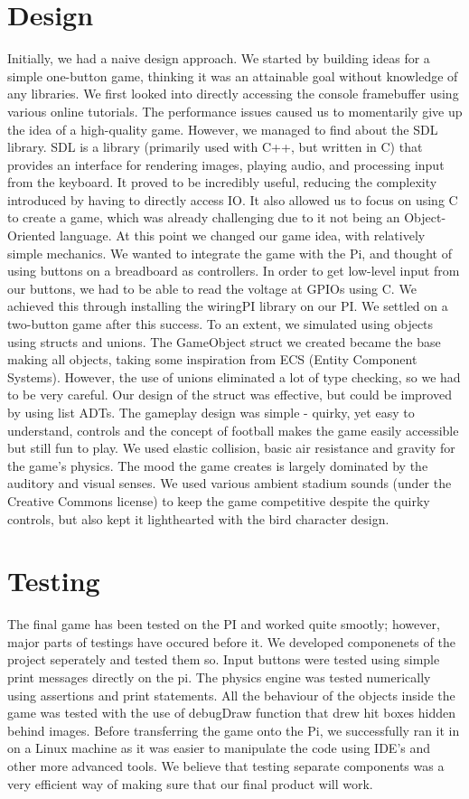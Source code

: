 \documentclass[11pt]{article}
\begin{document}
\section{Design}
Initially, we had a naive design approach. We started by building ideas for a simple one-button game, thinking it was an attainable goal without knowledge of any libraries. We first looked into directly accessing the console framebuffer using various online tutorials. The performance issues caused us to momentarily give up the idea of a high-quality game.
However, we managed to find about the SDL library. SDL is a library (primarily used with C++, but written in C) that provides an interface for rendering images, playing audio, and processing input from the keyboard. It proved to be incredibly useful, reducing the complexity introduced by having to directly access IO. It also allowed us to focus on using C to create a game, which was already challenging due to it not being an Object-Oriented language. At this point we changed our game idea, with relatively simple mechanics.
We wanted to integrate the game with the Pi, and thought of using buttons on a breadboard as controllers. In order to get low-level input from our buttons, we had to be able to read the voltage at GPIOs using C. We achieved this through installing the wiringPI library on our PI. We settled on a two-button game after this success.
To an extent, we simulated using objects using structs and unions. The GameObject struct we created became the base making all objects, taking some inspiration from ECS (Entity Component Systems). However, the use of unions eliminated a lot of type checking, so we had to be very careful. Our design of the struct was effective, but could be improved by using list ADTs.
The gameplay design was simple - quirky, yet easy to understand, controls and the concept of football makes the game easily accessible but still fun to play. We used elastic collision, basic air resistance and gravity for the game's physics.
The mood the game creates is largely dominated by the auditory and visual senses. We used various ambient stadium sounds (under the Creative Commons license) to keep the game competitive despite the quirky controls, but also kept it lighthearted with the bird character design.

\section{Testing}
The final game has been tested on the PI and worked quite smootly; however, major parts of testings have occured before it. We developed componenets of the project seperately and tested them so. Input buttons were tested using simple print messages directly on the pi. The physics engine was tested numerically using assertions and print statements. All the behaviour of the objects inside the game was tested with the use of debugDraw function that drew hit boxes hidden behind images. Before transferring the game onto the Pi, we successfully ran it in on a Linux machine as it was easier to manipulate the code using IDE's and other more advanced tools. We believe that testing separate components was a very efficient way of making sure that our final product will work. 
\end{document}

